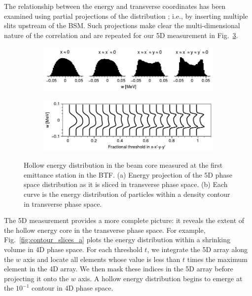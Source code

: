 \documentclass[letterpaper,
               keeplastbox,
               nospread,
               biblatex,
              ]{jacow}
\begin{document}
The relationship between the energy and transverse coordinates has been examined using partial projections of the  distribution \cite{CatheyPRL, Ruisard2021-hollow}; i.e., by inserting multiple slits upstream of the BSM. Such projections make clear the multi-dimensional nature of the correlation and are repeated for our 5D measurement in Fig.~\ref{fig:hollow}.

%
\begin{figure}[!t]
    \centering
    \begin{subfigure}{\columnwidth}
        \includegraphics[width=\textwidth]{w_slices.pdf}
        \caption{}
        \label{fig:hollow_a}
    \end{subfigure}
    \begin{subfigure}{\columnwidth}
        \includegraphics[width=\textwidth]{4Dcontour_dE2.pdf}
        \caption{}
        \label{fig:hollow_b}
    \end{subfigure}
    \caption{Hollow energy distribution in the beam core measured at the first emittance station in the BTF. (a) Energy projection of the 5D phase space distribution as it is sliced in transverse phase space. (b) Each curve is the energy distribution of particles within a density contour in transverse phase space.}
    \label{fig:hollow}
\end{figure}
%

The 5D measurement provides a more complete picture: it reveals the extent of the hollow energy core in the transverse phase space. For example, Fig.~\ref{fig:contour_slices_a} plots the energy distribution within a shrinking volume in 4D phase space. For each threshold $t$, we integrate the 5D array along the $w$ axis and locate all elements whose value is less than $t$ times the maximum element in the 4D array. We then mask these indices in the 5D array before projecting it onto the $w$ axis. A hollow energy distribution begins to emerge at the $10^{-1}$ contour in 4D phase space.
\end{document}
